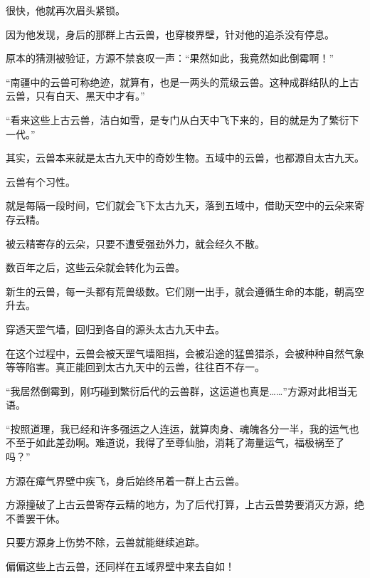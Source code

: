 \begin{this_body}
很快，他就再次眉头紧锁。

因为他发现，身后的那群上古云兽，也穿梭界壁，针对他的追杀没有停息。

原本的猜测被验证，方源不禁哀叹一声：“果然如此，我竟然如此倒霉啊！”

“南疆中的云兽可称绝迹，就算有，也是一两头的荒级云兽。这种成群结队的上古云兽，只有白天、黑天中才有。”

“看来这些上古云兽，洁白如雪，是专门从白天中飞下来的，目的就是为了繁衍下一代。”

其实，云兽本来就是太古九天中的奇妙生物。五域中的云兽，也都源自太古九天。

云兽有个习性。

就是每隔一段时间，它们就会飞下太古九天，落到五域中，借助天空中的云朵来寄存云精。

被云精寄存的云朵，只要不遭受强劲外力，就会经久不散。

数百年之后，这些云朵就会转化为云兽。

新生的云兽，每一头都有荒兽级数。它们刚一出手，就会遵循生命的本能，朝高空升去。

穿透天罡气墙，回归到各自的源头太古九天中去。

在这个过程中，云兽会被天罡气墙阻挡，会被沿途的猛兽猎杀，会被种种自然气象等等陷害。真正能回到太古九天中的云兽，往往百不存一。

“我居然倒霉到，刚巧碰到繁衍后代的云兽群，这运道也真是……”方源对此相当无语。

“按照道理，我已经和许多强运之人连运，就算肉身、魂魄各分一半，我的运气也不至于如此差劲啊。难道说，我得了至尊仙胎，消耗了海量运气，福极祸至了吗？”

方源在瘴气界壁中疾飞，身后始终吊着一群上古云兽。

方源撞破了上古云兽寄存云精的地方，为了后代打算，上古云兽势要消灭方源，绝不善罢干休。

只要方源身上伤势不除，云兽就能继续追踪。

偏偏这些上古云兽，还同样在五域界壁中来去自如！

\end{this_body}

